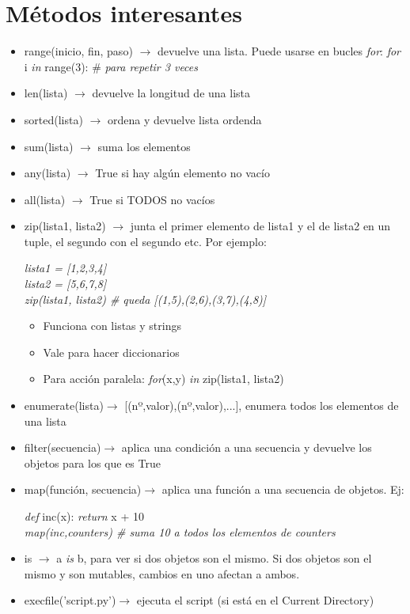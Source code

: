 \section{Métodos interesantes}\label{metodos}

	\begin{itemize}
	\item range(inicio, fin, paso) $\rightarrow$ devuelve una lista. Puede usarse en bucles \textit{for}: \textit{for} i \textit{in} range(3): \# \textit{para repetir 3 veces}
	\item len(lista) $\rightarrow$ devuelve la longitud de una lista
	\item sorted(lista) $\rightarrow$ ordena y devuelve lista ordenda
	\item sum(lista) $\rightarrow$ suma los elementos
	\item any(lista) $\rightarrow$ True si hay algún elemento no vacío
	\item all(lista) $\rightarrow$ True si TODOS no vacíos
	\item zip(lista1, lista2) $\rightarrow$ junta el primer elemento de lista1 y el de lista2 en un tuple, el segundo con el segundo etc. Por ejemplo:

	\textit{lista1 = [1,2,3,4]\\
	lista2 = [5,6,7,8]\\
	zip(lista1, lista2) \# queda [(1,5),(2,6),(3,7),(4,8)]}
		\begin{itemize}
		\item Funciona con listas y strings
		\item Vale para hacer diccionarios
		\item Para acción paralela: \textit{for}(x,y) \textit{in} zip(lista1, lista2) 
		\end{itemize}
	\item enumerate(lista)$\rightarrow$ [(nº,valor),(nº,valor),...], enumera todos los elementos de una lista
	\item filter(secuencia)$\rightarrow$ aplica una condición a una secuencia y devuelve los objetos para los que es True
	\item map(función, secuencia)$\rightarrow$ aplica una función a una secuencia de objetos. Ej:

	\textit{def} inc(x): \textit{return} x + 10 \\
	\textit{map(inc,counters) \# suma 10 a todos los elementos de counters}

	\item is $\rightarrow$ a \textit{is} b, para ver si dos objetos son el mismo. Si dos objetos son el mismo y son mutables, cambios en uno afectan a ambos. 
	\item execfile('script.py')$\rightarrow$ ejecuta el script (si está en el Current Directory)
	\end{itemize}